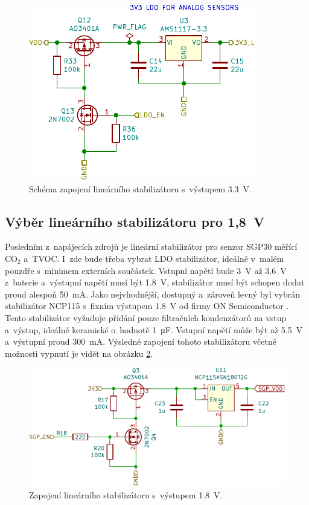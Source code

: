 \begin{figure}[h]
    \centering
    \includegraphics[scale=1.2]{obrazky/ldo-schematic.pdf}
    \caption{Schéma zapojení lineárního stabilizátoru s~výstupem \SI{3.3}{\volt}.}
    \label{fig_LDO-schematic}
\end{figure}

\subsection{Výběr lineárního stabilizátoru pro 1,8~V}

Posledním z~napájecích zdrojů je lineární stabilizátor pro senzor SGP30 měřící CO$_2$ a~TVOC. I~zde bude třeba vybrat LDO stabilizátor, ideálně v~malém pouzdře s~minimem externích součástek. Vstupní napětí bude \SI{3}{\volt} až \SI{3.6}{\volt} z~baterie a~výstupní napětí musí být \SI{1.8}{\volt}, stabilizátor musí být schopen dodat proud alespoň \SI{50}{\milli\ampere}. Jako nejvhodnější, dostupný a~zároveň levný byl vybrán stabilizátor NCP115 s~fixním výstupem \SI{1.8}{\volt} od firmy ON Semiconductor \cite{dat_NCP115}. Tento stabilizátor vyžaduje přidání pouze filtračních kondenzátorů na vstup a~výstup, ideálně keramické o~hodnotě \SI{1}{\micro\farad}. Vstupní napětí může být až \SI{5.5}{\volt} a~výstupní proud \SI{300}{\milli\ampere}. Výsledné zapojení tohoto stabilizátoru včetně možnosti vypnutí je vidět na obrázku \ref{fig_LDO1.8-schematic}.

\begin{figure}[h]
    \centering
    \includegraphics[scale=1.2]{obrazky/ldo18-schematic.pdf}
    \caption{Zapojení lineárního stabilizátoru s~výstupem \SI{1.8}{\volt}.}
    \label{fig_LDO1.8-schematic}
\end{figure}



